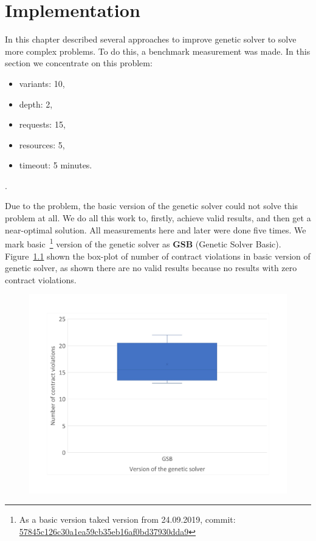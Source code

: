 \chapter{Implementation}\label{chapter:Implementation}

In this chapter described several approaches to improve genetic solver to solve more complex problems.
To do this, a benchmark measurement was made.
In this section we concentrate on this problem:

\begin{itemize}
	\item variants: 10,
	\item depth: 2,
	\item requests: 15,
	\item resources: 5,
	\item timeout: 5 minutes.
\end{itemize}.

Due to the problem, the basic version of the genetic solver could not solve this problem at all. We do all this work to, firstly, achieve valid results, and then get a near-optimal solution. 
All measurements here and later were done five times.
We mark basic~\footnote{As a basic version taked version from 24.09.2019, commit: \href{https://git-st.inf.tu-dresden.de/mquat/mquat2/commit/57845c126c30a1ea59cb35eb16af0bd37930dda9}{57845c126c30a1ea59cb35eb16af0bd37930dda9}} version of the genetic solver as \textbf{GSB} (Genetic Solver Basic).
Figure~\ref{fig:boxplotsolverbasic} shown the box-plot of number of contract violations in basic version of genetic solver, as shown there are no valid results because no results with zero contract violations.

\begin{figure}
	\centering
	\includegraphics[width=\textwidth]{images/BoxPlotSolverBasic}
	\caption[Boxplot with a number of contract violations for the basic version of genetic solver]{}
	\label{fig:boxplotsolverbasic}
\end{figure}


